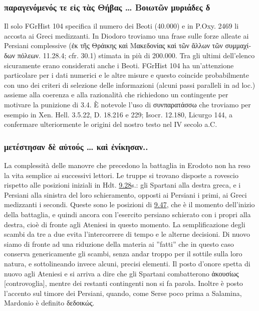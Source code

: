 {    \subsubsection{\textgreek{παραγενόμενός τε εἰς τὰς Θήβας … Βοιωτῶν μυριάδες δ}}  
    Il solo FGrHist 104 specifica il numero dei Beoti (40.000) e in P.Oxy. 2469 li accosta ai Greci medizzanti. In  Diodoro troviamo una frase sulle forze alleate ai Persiani complessive (\textgreek{ἐκ τῆς Θράικης καὶ Μακεδονίας καὶ τῶν ἄλλων τῶν συμμαχίδων πόλεων.} 11.28.4; cfr. 30.1) stimata in più di 200.000. Tra gli ultimi dell'elenco sicuramente erano considerati anche i Beoti. FGrHist 104 ha un'attenzione particolare per i dati numerici e le altre misure e questo coincide probabilmente con uno dei criteri di selezione delle informazioni (alcuni passi paralleli in \cite{Pownall2011} ad loc.) assieme alla coerenza e alla razionalità che richiedono un contingente per motivare la punizione di 3.4. È notevole l'uso di \textgreek{συνπαρατάσσω }che troviamo per esempio in Xen. Hell. 3.5.22, D. 18.216 e 229; Isocr. 12.180, Licurgo  144, a confermare ulteriormente le origini del nostro testo nel IV secolo a.C.  
    \subsubsection{\textgreek{μετέστησαν δὲ αὐτούς …  καὶ ἐνίκησαν..}}
    La complessità delle manovre che precedono la battaglia in Erodoto non ha reso la vita semplice ai successivi lettori. Le truppe si trovano disposte a rovescio rispetto alle posizioni iniziali in Hdt. \href{http://data.perseus.org/citations/urn:cts:greekLit:tlg0016.tlg001.perseus-grc1:9.28}{9.28}s.: gli Spartani alla destra greca, e i Persiani alla sinistra  del loro schieramento, opposti ai Persiani i primi, ai Greci medizzanti i secondi. Queste sono le posizioni di \href{http://data.perseus.org/citations/urn:cts:greekLit:tlg0016.tlg001.perseus-grc1:9.47}{9.47}, che è il momento dell'inizio della battaglia, e quindi ancora con l'esercito persiano schierato con i propri alla destra, cioè di fronte agli Ateniesi in questo momento. La semplificazione degli scambi da tre a due evita l'intercorrere di tempo e le alterne decisioni. Di nuovo siamo di fronte ad una riduzione della materia ai ''fatti'' che in questo caso conserva genericamente gli scambi, senza andar troppo per il sottile sulla loro natura, e sottolineando invece alcuni, precisi elementi. Il posto d'onore spetta di nuovo agli Ateniesi e si arriva a dire che gli Spartani combatterono \textgreek{ἀκουσίως} [controvoglia], mentre dei restanti contingenti non si fa parola. Inoltre è posto l'accento sul timore dei Persiani, quando, come Serse poco prima a Salamina, Mardonio è definito \textgreek{δεδοικώς}.   
}
